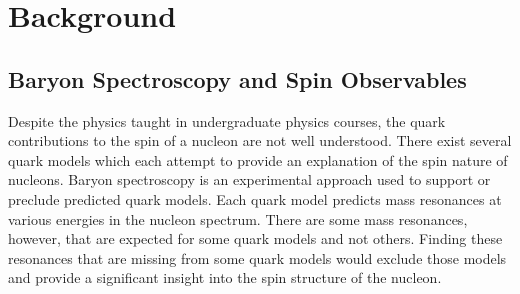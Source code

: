 \documentclass[a4paper,12pt]{article}
\begin{document}
\section{Background}
\subsection{Baryon Spectroscopy and Spin Observables} 
Despite the physics taught in undergraduate physics courses, the quark contributions to the spin of a nucleon are not well understood.  There exist several quark models which each attempt to provide an explanation of the spin nature of nucleons.  Baryon spectroscopy is an experimental approach used to support or preclude predicted quark models.  Each quark model predicts mass resonances at various energies in the nucleon spectrum.  There are some mass resonances, however, that are expected for some quark models and not others.  Finding these resonances that are missing from some quark models would exclude those models and provide a significant insight into the spin structure of the nucleon.
\end{document}

